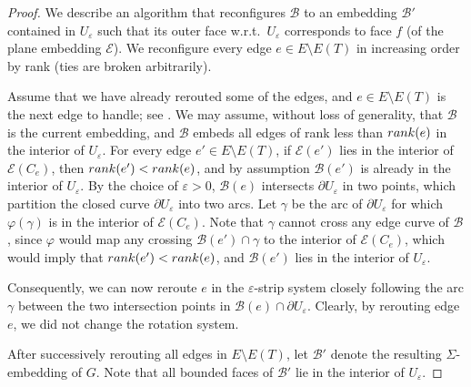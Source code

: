 \documentclass[10pt,a4paper]{amsart}
\begin{document}
\begin{proof}
    We describe an algorithm that reconfigures $\mathcal{B}$ to an embedding $\mathcal{B}'$ contained in $U_\varepsilon$ such that its outer face w.r.t.\ $U_\varepsilon$ corresponds to face $f$ (of the plane embedding $\mathcal{E}$). We reconfigure every edge $e\in E\setminus E(T)$ in increasing order by rank (ties are broken arbitrarily).

    Assume that we have already rerouted some of the edges, and $e\in E\setminus E(T)$ is the next edge to handle; see .
    We may assume, without loss of generality, that $\mathcal{B}$ is the current embedding, and $\mathcal{B}$ embeds all edges of rank less than ${\rm rank}(e)$ in the interior of $U_\varepsilon$.
    For every edge $e'\in E\setminus E(T)$, if $\mathcal{E}(e')$
    lies in the interior of $\mathcal{E}(C_e)$, then ${\rm rank}(e')<{\rm rank}(e)$, and by assumption $\mathcal{B}(e')$ is already in the interior of $U_\varepsilon$.
    By the choice of $\varepsilon>0$, $\mathcal{B}(e)$ intersects $\partial U_\varepsilon$ in two points, which partition the closed curve $\partial U_\varepsilon$ into two arcs. Let $\gamma$ be the arc of $\partial U_\varepsilon$ for which $\varphi(\gamma)$ is in the interior of $\mathcal{E}(C_e)$. Note that $\gamma$ cannot cross any edge curve of $\mathcal{B}$, since $\varphi$ would map any crossing $\mathcal{B}(e')\cap \gamma$ to the interior of $\mathcal{E}(C_e)$, which would imply that ${\rm rank}(e')<{\rm rank}(e)$, and $\mathcal{B}(e')$ lies in the interior of $U_\varepsilon$.

    Consequently, we can now reroute $e$ in the $\varepsilon$-strip system closely following the arc $\gamma$ between the two intersection points in $\mathcal{B}(e)\cap \partial U_\varepsilon$. Clearly, by rerouting edge $e$, we did not change the rotation system.

    After successively rerouting all edges in $E\setminus E(T)$, let $\mathcal{B}'$ denote the resulting $\Sigma$-embedding of $G$.
    Note that all bounded faces of $\mathcal{B}'$ lie in the interior of $U_\varepsilon$.
\end{proof}
\end{document}
